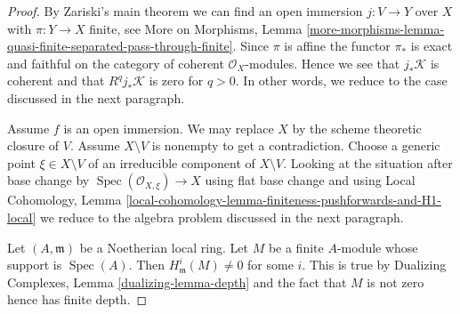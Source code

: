\documentclass[10pt,a4paper]{amsart}
\theoremstyle{plain}
\theoremstyle{definition}
\theoremstyle{remark}
\numberwithin{equation}{subsection}
\def\Spec{\mathop{\mathrm{Spec}}}
\begin{document}
\begin{proof}
By Zariski's main theorem we can find an open immersion
$j : V \to Y$ over $X$ with $\pi : Y \to X$ finite, see
More on Morphisms, Lemma
\ref{more-morphisms-lemma-quasi-finite-separated-pass-through-finite}.
Since $\pi$ is affine the functor $\pi_*$ is exact and faithful
on the category of coherent $\mathcal{O}_X$-modules.
Hence we see that $j_*\mathcal{K}$ is coherent and
that $R^qj_*\mathcal{K}$ is zero for $q > 0$.
In other words, we reduce to the case discussed in the next paragraph.

\medskip\noindent
Assume $f$ is an open immersion. We may replace $X$ by the
scheme theoretic closure of $V$. Assume $X \setminus V$ is nonempty
to get a contradiction. Choose a generic point $\xi \in X \setminus V$
of an irreducible component of $X \setminus V$. Looking at the situation
after base change by $\Spec(\mathcal{O}_{X, \xi}) \to X$ using flat base
change and using
Local Cohomology, Lemma
\ref{local-cohomology-lemma-finiteness-pushforwards-and-H1-local}
we reduce to the algebra problem discussed in the next paragraph.

\medskip\noindent
Let $(A, \mathfrak m)$ be a Noetherian local ring. Let $M$ be a finite
$A$-module whose support is $\Spec(A)$. Then $H^i_\mathfrak m(M) \not = 0$
for some $i$. This is true by
Dualizing Complexes, Lemma \ref{dualizing-lemma-depth}
and the fact that $M$ is not zero hence has finite depth.
\end{proof}
\end{document}
